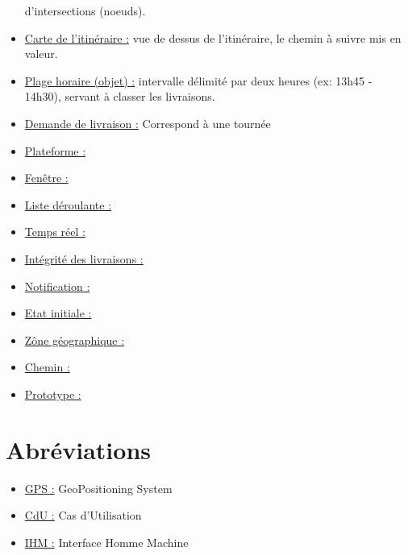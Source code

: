 \documentclass[a4paper]{report}
\begin{document}
\begin{appendices}
\begin{itemize}[label = \textbullet, font = \color{orange}]
            d’intersections (noeuds).
        \item \underline{Carte de l’itinéraire :} vue de dessus de
            l’itinéraire, le chemin à suivre mis en valeur.
        \item \underline{Plage horaire (objet) :} intervalle délimité par deux
            heures (ex: 13h45 - 14h30), servant à classer les livraisons.
        \item \underline{Demande de livraison :} Correspond à une tournée
        \item \underline{Plateforme :}
        \item \underline{Fenêtre :}
        \item \underline{Liste déroulante :}
        \item \underline{Temps réel :}
        \item \underline{Intégrité des livraisons :}
        \item \underline{Notification :}
        \item \underline{Etat initiale :}
        \item \underline{Zône géographique :}
        \item \underline{Chemin :}
        \item \underline{Prototype :}
    \end{itemize}

    \chapter{Abréviations}
    \begin{itemize}[label = \textbullet, font = \color{orange}]
        \item \underline{GPS :} GeoPositioning System
        \item \underline{CdU :} Cas d'Utilisation
        \item \underline{IHM :} Interface Homme Machine
    \end{itemize}
\end{appendices}
\end{document}
